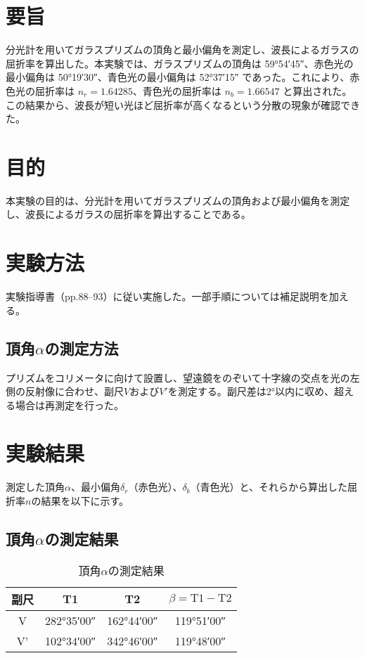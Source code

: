 \documentclass[a4paper,11pt,dvipdfmx]{jsarticle}
\begin{document}
\section{要旨}
分光計を用いてガラスプリズムの頂角と最小偏角を測定し、波長によるガラスの屈折率を算出した。本実験では、ガラスプリズムの頂角は \ang{59;54;45}、赤色光の最小偏角は \ang{50;19;30}、青色光の最小偏角は \ang{52;37;15} であった。これにより、赤色光の屈折率は $n_r = 1.64285$、青色光の屈折率は $n_b = 1.66547$ と算出された。この結果から、波長が短い光ほど屈折率が高くなるという分散の現象が確認できた。

\section{目的}
本実験の目的は、分光計を用いてガラスプリズムの頂角および最小偏角を測定し、波長によるガラスの屈折率を算出することである。

\section{実験方法}
実験指導書\cite{key1}（pp.88--93）に従い実施した。一部手順については補足説明を加える。

\subsection{頂角\boldmath$\alpha$の測定方法}
プリズムをコリメータに向けて設置し、望遠鏡をのぞいて十字線の交点を光の左側の反射像に合わせ、副尺$V$および$V'$を測定する。副尺差は\ang{2}以内に収め、超える場合は再測定を行った。

\section{実験結果}
測定した頂角$\alpha$、最小偏角$\delta_r$（赤色光）、$\delta_b$（青色光）と、それらから算出した屈折率$n$の結果を以下に示す。

\subsection{頂角$\alpha$の測定結果}
\begin{table}[H]
\centering
\caption{頂角$\alpha$の測定結果}
\label{tab:angle_measurement}
\begin{tabular}{|c|c|c|c|}
\hline
副尺 & T1 & T2 & $\beta = \text{T1} - \text{T2}$ \\
\hline
V  & \ang{282;35;00} & \ang{162;44;00} & \ang{119;51;00} \\
\hline
V' & \ang{102;34;00} & \ang{342;46;00} & \ang{119;48;00} \\
\hline
\end{tabular}
\end{table}
\end{document}
